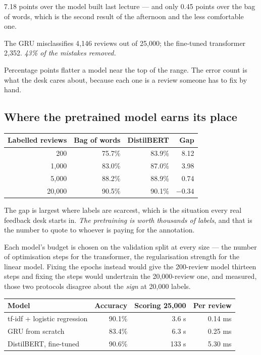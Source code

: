\documentclass[11pt,a4paper]{article}
\begin{document}
7.18 points over the model built last lecture --- and only 0.45 points over the
bag of words, which is the second result of the afternoon and the less
comfortable one.

\begin{keybox}[title={Say it in errors, not in points}]
The GRU misclassifies 4{,}146 reviews out of 25{,}000; the fine-tuned
transformer 2{,}352. \emph{43\% of the mistakes removed.}

Percentage points flatter a model near the top of the range. The error count is
what the desk cares about, because each one is a review someone has to fix by
hand.
\end{keybox}

\subsection{Where the pretrained model earns its place}

\begin{center}
\small
\begin{tabular}{rrrr}
\toprule
\textbf{Labelled reviews} & \textbf{Bag of words} & \textbf{DistilBERT} &
\textbf{Gap} \\
\midrule
   200 & 75.7\% & 83.9\% & 8.12 \\
 1{,}000 & 83.0\% & 87.0\% & 3.98 \\
 5{,}000 & 88.2\% & 88.9\% & 0.74 \\
20{,}000 & 90.5\% & 90.1\% & $-0.34$ \\
\bottomrule
\end{tabular}
\end{center}

The gap is largest where labels are scarcest, which is the situation every real
feedback desk starts in. \emph{The pretraining is worth thousands of labels},
and that is the number to quote to whoever is paying for the annotation.

Each model's budget is chosen on the validation split at every size --- the
number of optimisation steps for the transformer, the regularisation strength
for the linear model. Fixing the epochs instead would give the 200-review model
thirteen steps and fixing the steps would undertrain the 20{,}000-review one,
and measured, those two protocols disagree about the \emph{sign} at 20{,}000
labels.

\begin{center}
\small
\begin{tabular}{lrrr}
\toprule
\textbf{Model} & \textbf{Accuracy} & \textbf{Scoring 25{,}000} &
\textbf{Per review} \\
\midrule
tf-idf + logistic regression & 90.1\% & 3.6 s & 0.14 ms \\
GRU from scratch & 83.4\% & 6.3 s & 0.25 ms \\
DistilBERT, fine-tuned & 90.6\% & 133 s & 5.30 ms \\
\bottomrule
\end{tabular}
\end{center}
\end{document}
